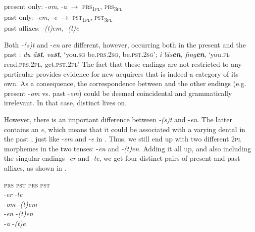 \documentclass[output=paper,colorlinks,citecolor=brown,draft,draftmode]{langscibook}
\begin{document}
\ea\label{ex:petzell:28}
\ea\label{ex:petzell:28a}  present  only:    -\textit{om}, -\textit{a}    $\to$ \textsc{prs}\textsubscript{1}\textsc{\textsubscript{pl}}, \textsc{prs}\textsubscript{3}\textsc{\textsubscript{pl}}\\
\ex\label{ex:petzell:28b}  past  only:    -\textit{em}, -\textit{e}   $\to$ \textsc{pst}\textsubscript{1}\textsc{\textsubscript{pl}}, \textsc{pst}\textsubscript{3}\textsc{\textsubscript{pl}}  \\
\ex\label{ex:petzell:28c}  past  affixes:   \textit{-(t)em}, -\textit{(t)e}
\z
\z


Both \textit{-(s)t} and -\textit{en} are different, however, occurring both in the present and the past : \textit{du ä\textbf{{st}}}, \textit{va\textbf{{st}}}, ‘you.\textsc{sg} be.\textsc{prs}.2\textsc{sg}, be.\textsc{pst}.2\textsc{sg}’; \textit{i läs\textbf{{en}}}\textit{, fing\textbf{{en}}}, ‘you.\textsc{pl} read.\textsc{prs}.2\textsc{pl}, get.\textsc{pst}.2\textsc{pl}’ The fact that these endings are not restricted to any particular  provides evidence for new acquirers that  is indeed a category of its own. As a consequence, the correspondence between  and the other endings (e.g. present  \nobreakdash-\textit{om} vs. past  \nobreakdash-\textit{em}) could be deemed coincidental and grammatically irrelevant. In that case, distinct  lives on.



However, there is an important difference between \textit{-(s)t} and -\textit{en}. The latter contains an \textit{e}, which means that it could be associated with a varying dental in the past , just like \nobreakdash-\textit{em} and -\textit{e} in . Thus, we still end up with two different 2\textsc{pl} morphemes in the two tenses: -\textit{en} and \textit{-(t)en}. Adding it all up, and also including the singular endings \nobreakdash-\textit{er} and \nobreakdash-\textit{te}, we get four distinct pairs of present and past  affixes, as shown in .\largerpage


\ea\label{ex:petzell:29}
\begin{tabbing}
\textsc{prs} \hspace{2\tabcolsep} \= \textsc{pst}\kill
\textsc{prs}       \>        \textsc{pst}\\
-\textit{er}       \>         -\textit{te}  \\
-\textit{om}       \>       -\textit{(t)em}  \\
-\textit{en}       \>       -\textit{(t)en}  \\
-\textit{a}        \>       -\textit{(t)e}
\end{tabbing}
\z
\end{document}
